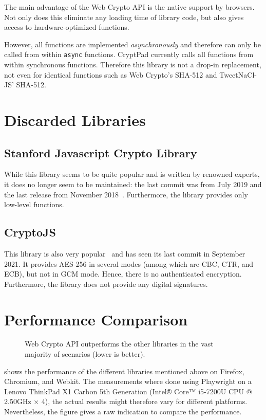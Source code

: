 \documentclass[a4paper, 11pt]{article}
\begin{document}
The main advantage of the Web Crypto API is the native support by browsers.
Not only does this eliminate any loading time of library code, but also gives access to hardware-optimized functions.

However, all functions are implemented \textit{asynchronously} and therefore can only be called from within \texttt{async} functions.
CryptPad currently calls all functions from within synchronous functions.
Therefore this library is not a drop-in replacement, not even for identical functions such as Web Crypto's SHA-512 and TweetNaCl-JS' SHA-512.

\section{Discarded Libraries}
\subsection{Stanford Javascript Crypto Library}

While this library seems to be quite popular and is written by renowned experts, it does no longer seem to be maintained: the last commit was from July 2019 and the last release from November 2018~\cite{Stark2015}.
Furthermore, the library provides only low-level functions.

\subsection{CryptoJS}
This library is also very popular~\cite{Mott2009} and has seen its last commit in September 2021.
It provides AES-256 in several modes (among which are CBC, CTR, and ECB), but not in GCM mode.
Hence, there is no authenticated encryption.
Furthermore, the library does not provide any digital signatures.


\section{Performance Comparison}
\label{sec:performance-comparison}

\begin{figure}[t!]
  \centering
  
  \caption{Web Crypto API outperforms the other libraries in the vast majority of scenarios (lower is better).}
  \label{fig:performance_plot}
\end{figure}

 shows the performance of the different
libraries mentioned above on Firefox, Chromium, and Webkit.
The measurements where done using Playwright on a Lenovo ThinkPad X1 Carbon 5th Generation (Intel® Core™ i5-7200U CPU @
2.50GHz × 4), the actual results might therefore vary for different platforms.
Nevertheless, the figure gives a raw indication to compare the performance.
\end{document}
